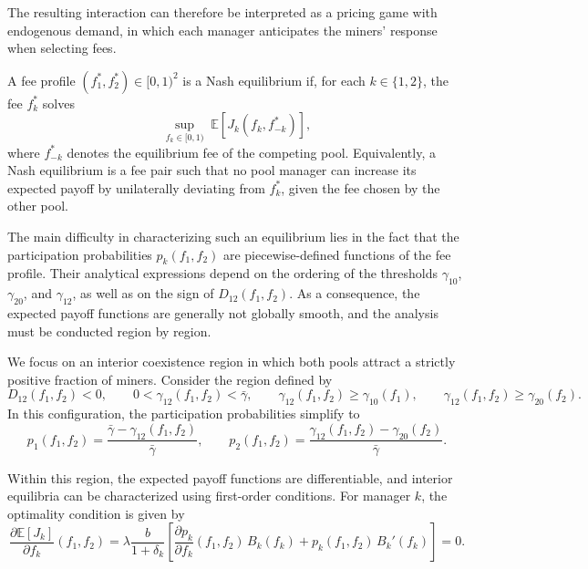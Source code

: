 The resulting interaction can therefore be interpreted as a pricing game with endogenous demand, in which each manager anticipates the miners’ response when selecting fees.

\begin{definition}
A fee profile $(f_1^*,f_2^*) \in [0,1)^2$ is a Nash equilibrium if, for each $k \in \{1,2\}$, the fee $f_k^*$ solves
\begin{equation}
\sup_{f_k \in [0,1)} \; \mathbb{E}[J_k(f_k,f_{-k}^*)],
\end{equation}
where $f_{-k}^*$ denotes the equilibrium fee of the competing pool. Equivalently, a Nash equilibrium is a fee pair such that no pool manager can increase its expected payoff by unilaterally deviating from $f_k^*$, given the fee chosen by the other pool.
\end{definition}

The main difficulty in characterizing such an equilibrium lies in the fact that the participation probabilities $p_k(f_1,f_2)$ are piecewise-defined functions of the fee profile. Their analytical expressions depend on the ordering of the thresholds $\gamma_{10}$, $\gamma_{20}$, and $\gamma_{12}$, as well as on the sign of $D_{12}(f_1,f_2)$. As a consequence, the expected payoff functions are generally not globally smooth, and the analysis must be conducted region by region.

We focus on an interior coexistence region in which both pools attract a strictly positive fraction of miners. Consider the region defined by
\begin{equation}\label{eq:region_conditions_refined}
D_{12}(f_1,f_2)<0,
\qquad
0<\gamma_{12}(f_1,f_2)<\bar{\gamma},
\qquad
\gamma_{12}(f_1,f_2)\geq \gamma_{10}(f_1),
\qquad
\gamma_{12}(f_1,f_2)\geq \gamma_{20}(f_2).
\end{equation}
In this configuration, the participation probabilities simplify to
\begin{equation}
p_1(f_1,f_2)
=
\frac{\bar{\gamma}-\gamma_{12}(f_1,f_2)}{\bar{\gamma}},
\qquad
p_2(f_1,f_2)
=
\frac{\gamma_{12}(f_1,f_2)-\gamma_{20}(f_2)}{\bar{\gamma}}.
\end{equation}

Within this region, the expected payoff functions are differentiable, and interior equilibria can be characterized using first-order conditions. For manager $k$, the optimality condition is given by
\begin{equation}\label{eq:foc_general_refined}
\frac{\partial \mathbb{E}[J_k]}{\partial f_k}(f_1,f_2)
=
\lambda\frac{b}{1+\delta_k}
\left[
\frac{\partial p_k}{\partial f_k}(f_1,f_2)\,B_k(f_k)
+
p_k(f_1,f_2)\,B_k'(f_k)
\right]
=0.
\end{equation}


